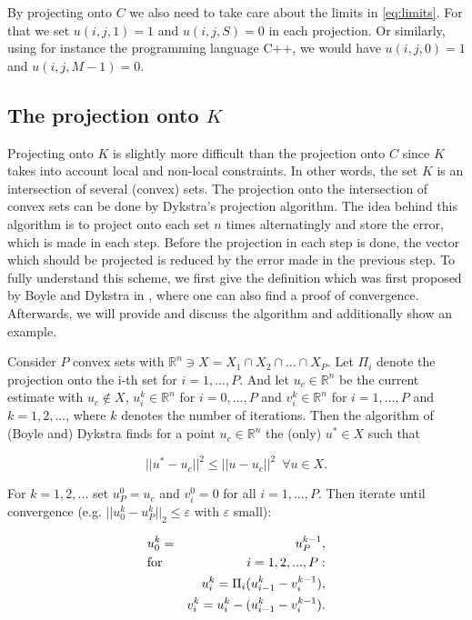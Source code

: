     \begin{remark}
        By projecting onto $C$ we also need to take care about the limits in \ref{eq:limits}. For that we set $u(i, j, 1) = 1$ and $u(i, j, S) = 0$ in each projection. Or similarly, using for instance the programming language C++, we would have $u(i, j, 0) = 1$ and $u(i, j, M-1) = 0$.
    \end{remark}

    \subsection{The projection onto $K$} %
    \label{sub:the_projection_onto_K}

        Projecting onto $K$ is slightly more difficult than the projection onto $C$ since $K$ takes into account local and non-local constraints. In other words, the set $K$ is an intersection of several (convex) sets. The projection onto the intersection of convex sets can be done by Dykstra's projection algorithm. The idea behind this algorithm is to project onto each set $n$ times alternatingly and store the error, which is made in each step. Before the projection in each step is done, the vector which should be projected is reduced by the error made in the previous step. To fully understand this scheme, we first give the definition which was first proposed by Boyle and Dykstra in \cite{dykstra-et-al-aors14}, where one can also find a proof of convergence. Afterwards, we will provide and discuss the algorithm and additionally show an example.

        Consider $P$ convex sets with $\mathbb{R}^{n} \ni X = X_{1} \cap X_{2} \cap ... \cap X_{P}$. Let $\Pi_{i}$ denote the projection onto the i-th set for $i = 1, ..., P$. And let $u_{c} \in \mathbb{R}^{n}$ be the current estimate with $u_{c} \notin X$, $u_{i}^{k} \in \mathbb{R}^{n}$ for $i = 0, ..., P$ and $v_{i}^{k} \in \mathbb{R}^{n}$ for $i = 1, ..., P$ and $k = 1, 2, ...$, where $k$ denotes the number of iterations. Then the algorithm of (Boyle and) Dykstra finds for a point $u_{c} \in \mathbb{R}^{n}$ the (only) $u^{\ast} \in X$ such that

        $$
            ||u^{\ast} - u_{c}||^{2} \le ||u - u_{c}||^{2} \,\,\, \forall u \in X.
        $$

        \begin{algorithm}\label{alg:dykstra}
            For $k = 1, 2, ...$ set $u^{0}_{P} = u_{c}$ and $v^{0}_{i} = 0$ for all $i = 1, ..., P$. Then iterate until convergence (e.g. $||u_{0}^{k} - u_{P}^{k}||_{2} \le \varepsilon$ with $\varepsilon$ small):

            \begin{eqnarray}
                &u_{0}^{k} = &u_{P}^{k-1}, \notag \\
                &\textnormal{for} \,\, &i = 1, 2, ..., P: \notag \\
                &&u_{i}^{k} = \Pi_{i}(u_{i-1}^{k} - v_{i}^{k-1}), \notag \\
                &&v_{i}^{k} = u_{i}^{k} - (u_{i-1}^{k} - v_{i}^{k-1}). \notag
            \end{eqnarray}
        \end{algorithm}

